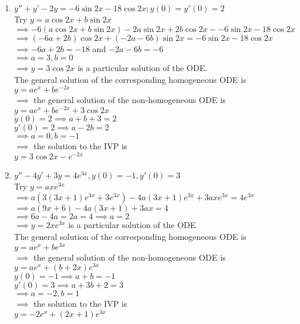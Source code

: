 \documentclass[a4paper]{article}
\begin{document}
\begin{enumerate}
\begin{enumerate}
		\item $y''+y'-2y=-6\sin 2x -18\cos 2x; y(0)=y'(0)=2$\\
		Try $y=a\cos 2x + b\sin 2x$\\
		$\implies -6(a\cos 2x + b\sin 2x) - 2a\sin 2x +2b\cos 2x--6\sin 2x -18\cos 2x$\\
		$\implies (-6a+2b)\cos 2x + (-2a-6b) \sin 2x =-6\sin 2x -18\cos 2x$\\
		$\implies -6a+2b=-18$ and $-2a-6b=-6$\\
		$\implies a=3, b=0$\\
		$\implies y=3\cos 2x$ is a particular solution of the ODE.\\
		The general solution of the corresponding homogeneous ODE is $y=ae^x+be^{-2x}$\\		
		$\implies$ the general solution of the non-homogeneous ODE is\\
		$y=ae^x+be^{-2x}+3\cos 2x$\\
		$y(0)=2 \implies a+b+3=2$\\
		$y'(0)=2 \implies a -2b=2$\\
		$\implies a=0, b=-1$\\
		$\implies$ the solution to the IVP is\\
		$y=3\cos 2x -e^{-2x}$
		
		\item $y''-4y'+3y=4e^{3x}, y(0)=-1,y'(0)=3$\\
		Try $y=axe^{3x}$\\
		$\implies a(3(3x+1)e^{3x} +3e^{3x}) -4a(3x+1)e^{3x} +3axe^{3x}=4e^{3x}$\\
		$\implies a(9x +6) -4a(3x+1) +3ax=4$\\
		$\implies 6a-4a=2a=4 \implies a=2$\\
		$\implies y=2xe^{3x}$ is a particular solution of the ODE\\
		The general solution of the corresponding homogeneous ODE is $y=ae^x+be^{3x}$\\
		$\implies$ the general solution of the non-homogeneous ODE is\\
		$y=ae^x+(b+2x)e^{3x}$\\
		$y(0)=-1 \implies a+b=-1$\\
		$y'(0)=3 \implies a +3b +2=3$\\
		$\implies a=-2, b=1$\\
		$\implies$ the solution to the IVP is\\
		$y=-2e^x+(2x+1)e^{3x}$
	\end{enumerate}


\end{enumerate}
\end{document}
